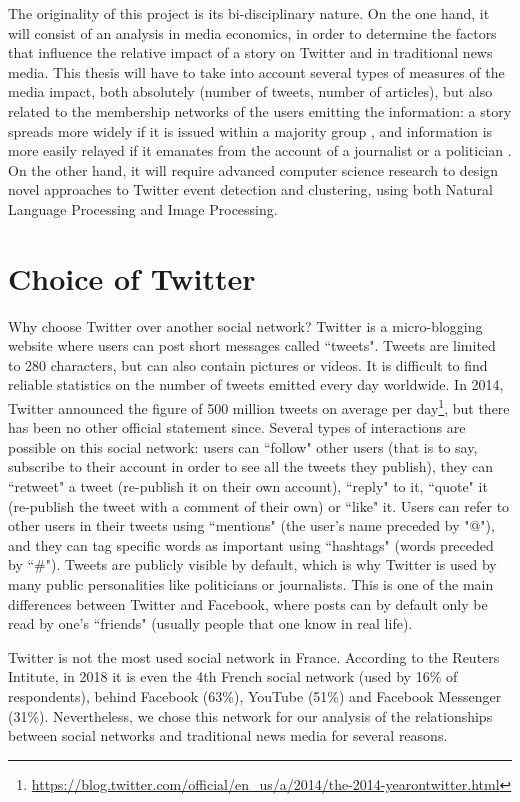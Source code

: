 The originality of this project is its bi-disciplinary nature. On the one hand, it will consist of an analysis in media economics, in order to determine the factors that influence the relative impact of a story on Twitter and in traditional news media. This thesis will have to take into account several types of measures of the media impact, both absolutely (number of tweets, number of articles), but also related to the membership networks of the users emitting the information:  a story spreads more widely if it is issued within a majority group \citep{HalberstamKnight2016}, and information is more easily relayed if it emanates from the account of a journalist or a politician \citep{harder_making_2016}. On the other hand, it will require advanced computer science research to design novel approaches to Twitter event detection and clustering, using both Natural Language Processing and Image Processing.


\section{Choice of Twitter}
Why choose Twitter over another social network? Twitter is a micro-blogging website where users can post short messages called ``tweets". Tweets are limited to 280 characters, but can also contain pictures or videos. It is difficult to find reliable statistics on the number of tweets emitted every day worldwide. In 2014, Twitter announced the figure of 500 million tweets on average per day\footnote{\url{https://blog.twitter.com/official/en_us/a/2014/the-2014-yearontwitter.html}}, but there has been no other official statement since.   Several types of interactions are possible on this social network: users can ``follow" other users (that is to say, subscribe to their account in order to see all the tweets they publish), they can ``retweet" a tweet (re-publish it on their own account), ``reply" to it, ``quote" it (re-publish the tweet with a comment of their own) or ``like" it. Users can refer to other users in their tweets using ``mentions" (the user's name preceded by "@"), and they can tag specific words as important using ``hashtags" (words preceded by ``\#"). Tweets are publicly visible by default, which is why Twitter is used by many public personalities like politicians or journalists. This is one of the main differences between Twitter and Facebook, where posts can by default only be read by one's ``friends" (usually people that one know in real life).

	
	Twitter is not the most used social network in France. According to the Reuters Intitute, in 2018 it is even the 4th French social network (used by 16\% of respondents), behind Facebook (63\%), YouTube (51\%) and Facebook Messenger (31\%). Nevertheless, we chose this network for our analysis of the relationships between social networks and traditional news media for several reasons. 


